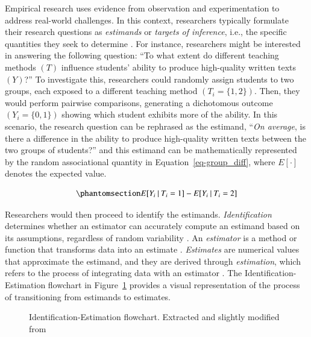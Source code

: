\documentclass[
  authoryear,
  review,
  1p]{elsarticle}
\begin{document}
Empirical research uses evidence from observation and experimentation to
address real-world challenges. In this context, researchers typically
formulate their research questions as \emph{estimands} or \emph{targets
of inference}, i.e., the specific quantities they seek to determine
\citep{Everitt_et_al_2010}. For instance, researchers might be
interested in answering the following question: ``To what extent do
different teaching methods \((T)\) influence students' ability to
produce high-quality written texts \((Y)\)?'' To investigate this,
researchers could randomly assign students to two groups, each exposed
to a different teaching method \((T_{i} = \{1,2\})\). Then, they would
perform pairwise comparisons, generating a dichotomous outcome
\((Y_{i} = \{0,1\})\) showing which student exhibits more of the
ability. In this scenario, the research question can be rephrased as the
estimand, ``\emph{On average}, is there a difference in the ability to
produce high-quality written texts between the two groups of students?''
and this estimand can be mathematically represented by the random
associational quantity in Equation~\ref{eq-group_diff}, where
\(E[\cdot]\) denotes the expected value.

\begin{equation}\phantomsection\label{eq-group_diff}{
E[Y_{i} \:|\:T_{i}=1] - E[Y_{i} \:|\:T_{i}=2]
}\end{equation}

Researchers would then proceed to identify the estimands.
\emph{Identification} determines whether an estimator can accurately
compute an estimand based on its assumptions, regardless of random
variability \citep[pp.~4]{Schuessler_et_al_2023}. An \emph{estimator} is
a method or function that transforms data into an estimate
\citep{Neal_2020}. \emph{Estimates} are numerical values that
approximate the estimand, and they are derived through
\emph{estimation}, which refers to the process of integrating data with
an estimator \citep{Everitt_et_al_2010}. The Identification-Estimation
flowchart \citep{McElreath_2020, Neal_2020} in Figure~\ref{fig-IEflow}
provides a visual representation of the process of transitioning from
estimands to estimates.

\begin{figure}


\caption{\label{fig-IEflow}Identification-Estimation flowchart.
Extracted and slightly modified from \citet[pp.~32]{Neal_2020}}

\end{figure}%
\end{document}
